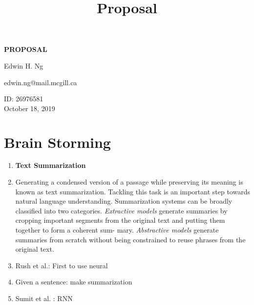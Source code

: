 \documentclass[12pt,a4paper]{report}
\begin{document}
\title{Proposal\\
}


\setcounter{page}{1}
\thispagestyle{empty} 
\begin{titlepage}

    \begin{center}
        \vspace*{0.7cm}
         \Huge
        \textbf{PROPOSAL}
  
        \vspace{2cm}
          \Large
          Edwin H. Ng
                
        \vspace{2cm}
        
        edwin.ng@mail.mcgill.ca
                
        \vspace{2cm}

        \Large
        ID: 26976581\\
           \vspace{10cm}
        October 18, 2019\\
        \vspace{2cm}    
    \end{center}
\end{titlepage}


\chapter*{Brain Storming}
\begin{enumerate}
\item \textbf{Text Summarization}
\item Generating a condensed version of a passage while preserving its meaning is known as text summarization. Tackling this task is an important step towards natural language understanding. Summarization systems can be broadly classified into two categories. \textit{Extractive models} generate summaries by cropping important segments from the original text and putting them together to form a coherent sum- mary. \textit{Abstractive models} generate summaries from scratch without being constrained to reuse phrases from the original text.
\item Rush et al.: First to use neural
\item Given a sentence: make summarization
\item Sumit et al. : RNN
\end{enumerate}
\end{document}

